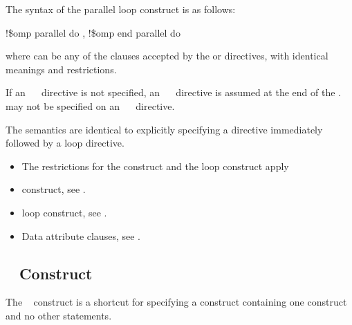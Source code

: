 \fortranspecificstart
The syntax of the parallel loop construct is as follows:

\begin{boxedcode}
!\$omp parallel do \plc{[clause[ [},\plc{] clause] ... ]}
\plc{[}!\$omp end parallel do\plc{]} 
\end{boxedcode}

where  can be any of the clauses accepted by the  or  directives, 
with identical meanings and restrictions. 

If an ~~ directive is not specified, an ~~ directive is 
assumed at the end of the .  may not be specified on an 
~~ directive.
\fortranspecificend

\descr
The semantics are identical to explicitly specifying a  directive immediately 
followed by a loop directive.

\restrictions
\begin{itemize}
\item The restrictions for the  construct and the loop construct apply
\end{itemize}

\crossreferences
\begin{itemize}
\item {} construct, see 
.

\item loop construct, see 
.

\item Data attribute clauses, see 
.
\end{itemize}







\subsection{~ Construct}
\label{subsec:parallel sections Construct}
\summary
The ~ construct is a shortcut for specifying a  
construct containing one  construct and no other statements.

